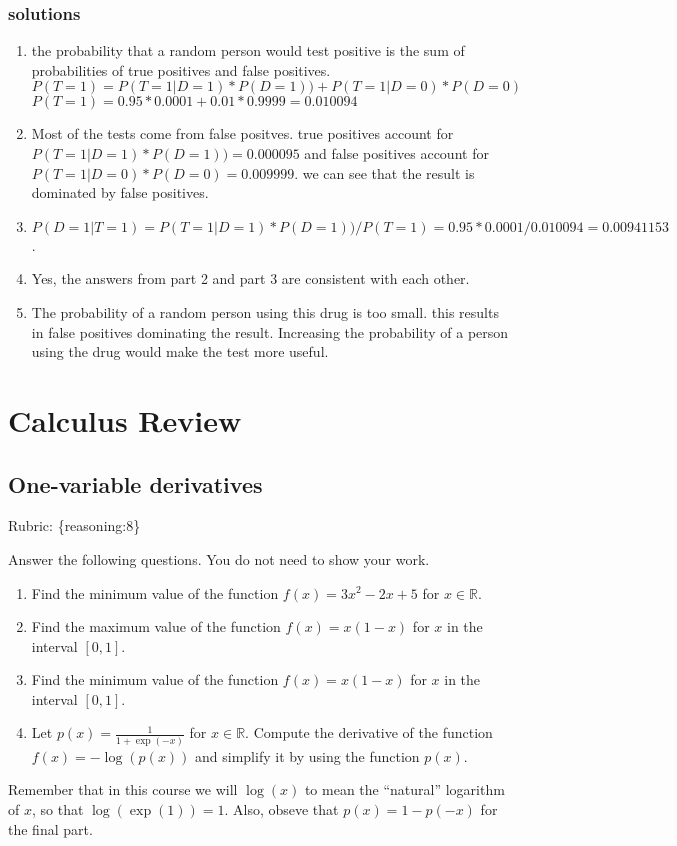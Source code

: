 \documentclass{article}
\def\rubric#1{\gre{Rubric: \{#1\}}}{}
\def\blu#1{{\color{blu}#1}}
\def\gre#1{{\color{gre}#1}}
\def\R{\mathbb{R}}
\def\enum#1{\begin{enumerate}#1\end{enumerate}}
\begin{document}
\subsubsection{solutions}
\enum{
\item the probability that a random person would test positive is the sum of probabilities of true positives and false positives.  
\newline $P(T = 1)    = P(T=1|D=1) * P(D=1)) + P(T=1|D=0) * P(D=0)$
\newline $P(T = 1) = 0.95 * 0.0001 + 0.01 * 0.9999 = 0.010094$
\item Most of the tests come from false positves. true positives account for $P(T=1|D=1) * P(D=1)) = 0.000095 $ and false positives account for $ P(T=1|D=0) * P(D=0) = 0.009999$. we can see that the result is dominated by false positives.
\item $ P(D=1|T=1) = P(T=1|D=1) * P(D=1)) / P(T = 1) = 0.95 * 0.0001 / 0.010094 = 0.00941153 $.
\item Yes, the answers from part 2 and part 3 are consistent with each other.
\item The probability of a random person using this drug is too small. this results in false positives dominating the result. Increasing the probability of a person using the drug would make the test more useful.
}

\section{Calculus Review}


\subsection{One-variable derivatives}
\rubric{reasoning:8}

\blu{Answer the following questions.} You do not need to show your work.

\begin{enumerate}
\item Find the minimum value of the function $f(x) = 3x^2 -2x + 5$ for $x \in \R$.
\item Find the maximum value of the function $f(x) = x(1-x)$ for $x$ in the interval $[0,1]$.
\item Find the minimum value of the function $f(x) = x(1-x)$ for $x$ in the interval $[0,1]$.
\item Let $p(x) = \frac{1}{1+\exp(-x)}$ for $x \in \R$. Compute the derivative of the function $f(x) = -\log(p(x))$ and simplify it by using the function $p(x)$.
\end{enumerate}
Remember that in this course we will $\log(x)$ to mean the ``natural'' logarithm of $x$, so that $\log(\exp(1)) = 1$. Also, obseve that $p(x) = 1-p(-x)$ for the final part.
\end{document}
